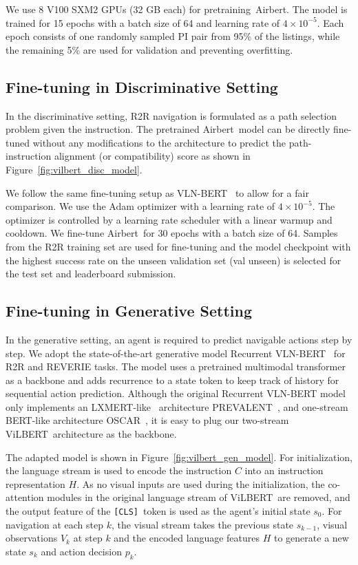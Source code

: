 \RequirePackage[dvipsnames,table]{xcolor} \documentclass[10pt,twocolumn,letterpaper]{article}
\newcommand{\vilbert}{ViLBERT}
\newcommand{\vlnbert}{VLN-BERT}
\newcommand{\airbert}{Airbert}
\newcommand{\cls}{\texttt{[CLS]}}
\begin{document}
We use 8 V100 SXM2 GPUs (32 GB each) for pretraining~\airbert.
The model is trained for 15 epochs with a batch size of 64 and learning rate of $4\times10^{-5}$.
Each epoch consists of one randomly sampled PI pair from 95\% of the listings, while the remaining 5\% are used for validation and preventing overfitting.


\subsection{Fine-tuning in Discriminative Setting}
In the discriminative setting, R2R navigation is formulated as a path selection problem given the instruction.
The pretrained \airbert~model can be directly fine-tuned without any modifications to the architecture to predict the path-instruction alignment (or compatibility) score as shown in Figure~\ref{fig:vilbert_disc_model}.

We follow the same fine-tuning setup as \vlnbert~\cite{majumdar2020vlnbert} to allow for a fair comparison.
We use the Adam optimizer with a learning rate of $4\times10^{-5}$.
The optimizer is controlled by a learning rate scheduler with a linear warmup and cooldown. 
We fine-tune \airbert~for 30 epochs with a batch size of 64.
Samples from the R2R training set are used for fine-tuning and the model checkpoint with the highest success rate on the unseen validation set (val unseen) is selected for the test set and leaderboard submission.



\subsection{Fine-tuning in Generative Setting}
In the generative setting, an agent is required to predict navigable actions step by step.
We adopt the state-of-the-art generative model Recurrent VLN-BERT~\cite{hong2021recurrentvln} for R2R and REVERIE tasks.
The model uses a pretrained multimodal transformer as a backbone and adds recurrence to a state token to keep track of history for sequential action prediction.
Although the original Recurrent VLN-BERT model only implements an LXMERT-like~\cite{tan2019lxmert} architecture PREVALENT~\cite{hao2020prevalent}, and one-stream BERT-like architecture OSCAR~\cite{li2020oscar}, it is easy to plug our two-stream \vilbert~architecture as the backbone.

The adapted model is shown in Figure~\ref{fig:vilbert_gen_model}.
For initialization, the language stream is used to encode the instruction $C$ into an instruction representation $H$.
As no visual inputs are used during the initialization, the co-attention modules in the original language stream of \vilbert~are removed, and the output feature of the \cls~token is used as the agent's initial state $s_0$.
For navigation at each step $k$, the visual stream takes the previous state $s_{k-1}$, visual observations $V_k$ at step $k$ and the encoded language features $H$ to generate a new state $s_k$ and action decision $p_k$.
\end{document}
